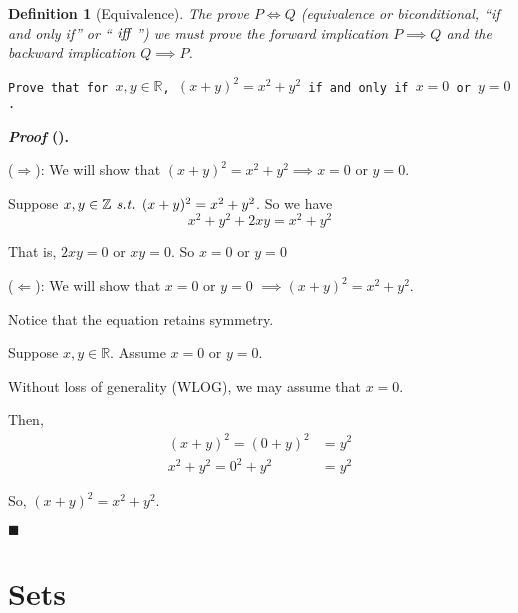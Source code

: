 \documentclass[12pt,a4paper]{article}
\newcounter{nprf}[subsection]
\newtheorem{df}{Definition}[subsection]
\newenvironment*{prf}{\par\indent\textbf{\textit{Proof} (\stepcounter{nprf}\thenprf). }\par}{\par\hfill $\blacksquare$\par}
\def\Z{{\mathbb{Z}}}
\def\R{{\mathbb{R}}}
\def\st{\emph{ s.t. }}
\def\Iff{\emph{ iff }}
\begin{document}
\begin{df}[Equivalence]
	The prove $P\iff Q$ (equivalence or biconditional, ``if and only if'' or ``$\Iff$'')	we must prove the forward implication $P\implies Q$ and the backward implication $Q\implies P$.
\end{df}
\begin{framed}
\noindent\texttt{Prove that for $x,y\in\R$, $(x+y)^2=x^2+y^2$ if and only if $x=0$ or $y=0$.}
\begin{prf}
	($\Rightarrow$): We will show that $(x+y)^2=x^2+y^2\implies x=0$ or $y=0$.\par Suppose $x,y\in\Z\st(x+y)^2=x^2+y^2$. So we have \[x^2+y^2+2xy=x^2+y^2\]\par That is, $2xy=0$ or $xy=0$. So $x=0$ or $y=0$\par ($\Leftarrow$): We will show that $x=0$ or $y=0$ $\implies(x+y)^2=x^2+y^2$. \par Notice that the equation retains symmetry. \par Suppose $x,y\in\R$. Assume $x=0$ or $y=0$.\par Without loss of generality (WLOG), we may assume that $x=0$.\par Then, \[\begin{aligned}(x+y)^2=(0+y)^2&=y^2\\x^2+y^2=0^2+y^2&=y^2\end{aligned}\]\par So, $(x+y)^2=x^2+y^2.$
\end{prf}
\end{framed}

\newpage
\section{Sets}
\end{document}
